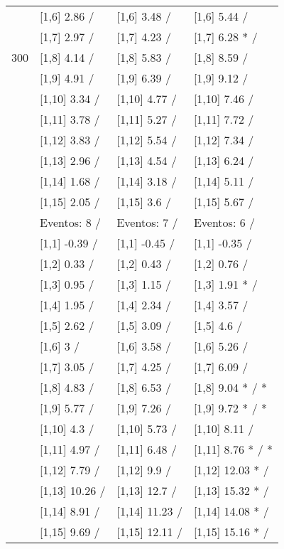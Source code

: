 \begin{table}
\begin{tabular}[t]{llll}
 & {}[1,6] 2.86  / & {}[1,6] 3.48  / & {}[1,6] 5.44  /\\
 & {}[1,7] 2.97  / & {}[1,7] 4.23  / & {}[1,7] 6.28 * /\\
300 & {}[1,8] 4.14  / & {}[1,8] 5.83  / & {}[1,8] 8.59  /\\
\addlinespace
 & {}[1,9] 4.91  / & {}[1,9] 6.39  / & {}[1,9] 9.12  /\\
 & {}[1,10] 3.34  / & {}[1,10] 4.77  / & {}[1,10] 7.46  /\\
 & {}[1,11] 3.78  / & {}[1,11] 5.27  / & {}[1,11] 7.72  /\\
 & {}[1,12] 3.83  / & {}[1,12] 5.54  / & {}[1,12] 7.34  /\\
 & {}[1,13] 2.96  / & {}[1,13] 4.54  / & {}[1,13] 6.24  /\\
\addlinespace
 & {}[1,14] 1.68  / & {}[1,14] 3.18  / & {}[1,14] 5.11  /\\
 & {}[1,15] 2.05  / & {}[1,15] 3.6  / & {}[1,15] 5.67  /\\
 & Eventos:  8 / & Eventos:  7 / & Eventos:  6 /\\
 & {}[1,1] -0.39  / & {}[1,1] -0.45  / & {}[1,1] -0.35  /\\
 & {}[1,2] 0.33  / & {}[1,2] 0.43  / & {}[1,2] 0.76  /\\
\addlinespace
 & {}[1,3] 0.95  / & {}[1,3] 1.15  / & {}[1,3] 1.91 * /\\
 & {}[1,4] 1.95  / & {}[1,4] 2.34  / & {}[1,4] 3.57  /\\
 & {}[1,5] 2.62  / & {}[1,5] 3.09  / & {}[1,5] 4.6  /\\
 & {}[1,6] 3  / & {}[1,6] 3.58  / & {}[1,6] 5.26  /\\
 & {}[1,7] 3.05  / & {}[1,7] 4.25  / & {}[1,7] 6.09  /\\
\addlinespace
500 & {}[1,8] 4.83  / & {}[1,8] 6.53  / & {}[1,8] 9.04 * / *\\
 & {}[1,9] 5.77  / & {}[1,9] 7.26  / & {}[1,9] 9.72 * / *\\
 & {}[1,10] 4.3  / & {}[1,10] 5.73  / & {}[1,10] 8.11  /\\
 & {}[1,11] 4.97  / & {}[1,11] 6.48  / & {}[1,11] 8.76 * / *\\
 & {}[1,12] 7.79  / & {}[1,12] 9.9  / & {}[1,12] 12.03 * /\\
\addlinespace
 & {}[1,13] 10.26  / & {}[1,13] 12.7  / & {}[1,13] 15.32 * /\\
 & {}[1,14] 8.91  / & {}[1,14] 11.23  / & {}[1,14] 14.08 * /\\
 & {}[1,15] 9.69  / & {}[1,15] 12.11  / & {}[1,15] 15.16 * /\\
\bottomrule
\end{tabular}
\end{table}
